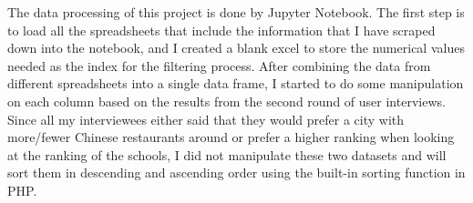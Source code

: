 \documentclass[10pt,twocolumn]{article}
\begin{document}
The data processing of this project is done by Jupyter Notebook. The first step is to load all the spreadsheets that include the information that I have scraped down into the notebook, and I created a blank excel to store the numerical values needed as the index for the filtering process. After combining the data from different spreadsheets into a single data frame, I started to do some manipulation on each column based on the results from the second round of user interviews. 
\newline
\indent
Since all my interviewees either said that they would prefer a city with more/fewer Chinese restaurants around or prefer a higher ranking when looking at the ranking of the schools, I did not manipulate these two datasets and will sort them in descending and ascending order using the built-in sorting function in PHP.
\end{document}
